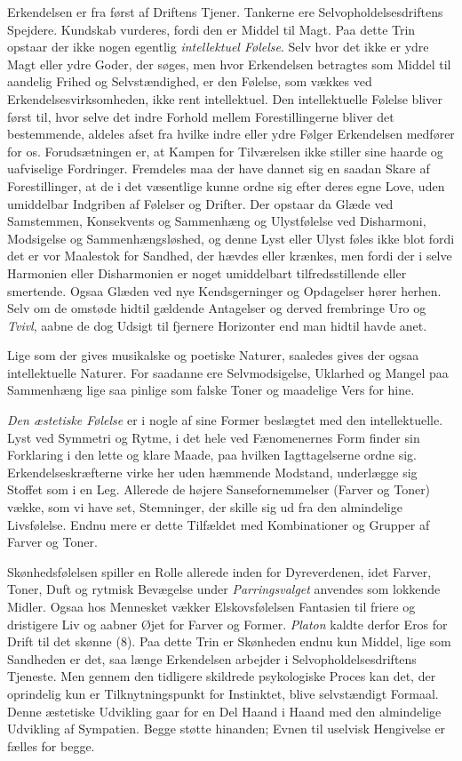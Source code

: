 \documentclass[12pt,a4paper,openany]{book}
\newcommand{\opage}[1]{\marginnote{\footnotesize\textit{[#1]}}}
\begin{document}
Erkendelsen er fra først af Driftens Tjener. Tankerne ere
Selvopholdelsesdriftens Spejdere. Kundskab vurderes, fordi den er Middel
til Magt. Paa dette Trin opstaar der ikke nogen egentlig
\emph{intellektuel Følelse}. Selv hvor det ikke er ydre Magt eller ydre
Goder, der søges, men hvor Erkendelsen betragtes som Middel til aandelig
Frihed og Selvstændighed, er den Følelse, som vækkes ved
Erkendelsesvirksomheden, ikke rent intellektuel. Den intellektuelle
Følelse bliver først til, hvor selve det indre Forhold mellem
Forestillingerne bliver det bestemmende, aldeles afset fra hvilke indre
eller ydre Følger Erkendelsen medfører for os. Forudsætningen er, at
Kampen for Tilværelsen ikke stiller sine haarde og uafviselige
Fordringer. Fremdeles maa der have dannet sig en saadan Skare af
Forestillinger, at de i det væsentlige kunne ordne sig efter deres egne
Love, uden umiddelbar Indgriben af Følelser og Drifter. Der opstaar da
Glæde ved Samstemmen, Konsekvents og Sammenhæng og Ulystfølelse ved
Disharmoni, Modsigelse og Sammenhængsløshed, og denne Lyst eller Ulyst
føles ikke blot fordi det er vor Maalestok for Sandhed, der hævdes eller
krænkes, men fordi der i selve Harmonien eller Disharmonien er noget
umiddelbart tilfredsstillende eller smertende. Ogsaa Glæden ved nye
Kendsgerninger og Opdagelser hører herhen. Selv om de omstøde hidtil
gældende Antagelser
\opage{315}og derved frembringe Uro og \emph{Tvivl}, aabne de dog Udsigt
til fjernere Horizonter end man hidtil havde anet.

Lige som der gives musikalske og poetiske Naturer, saaledes gives der
ogsaa intellektuelle Naturer. For saadanne ere Selvmodsigelse, Uklarhed
og Mangel paa Sammenhæng lige saa pinlige som falske Toner og maadelige
Vers for hine.

\emph{Den æstetiske Følelse} er i nogle af sine Former beslægtet med den
intellektuelle. Lyst ved Symmetri og Rytme, i det hele ved Fænomenernes
Form finder sin Forklaring i den lette og klare Maade, paa hvilken
Iagttagelserne ordne sig. Erkendelseskræfterne virke her uden hæmmende
Modstand, underlægge sig Stoffet som i en Leg. Allerede de højere
Sansefornemmelser (Farver og Toner) vække, som vi have set, Stemninger,
der skille sig ud fra den almindelige Livsfølelse. Endnu mere er dette
Tilfældet med Kombinationer og Grupper af Farver og Toner.

Skønhedsfølelsen spiller en Rolle allerede inden for Dyreverdenen, idet
Farver, Toner, Duft og rytmisk Bevægelse under \emph{Parringsvalget}
anvendes som lokkende Midler. Ogsaa hos Mennesket vækker Elskovsfølelsen
Fantasien til friere og dristigere Liv og aabner Øjet for Farver og
Former. \emph{Platon} kaldte derfor Eros for Drift til det skønne (8).
Paa dette Trin er Skønheden endnu kun Middel, lige som Sandheden er det,
saa længe Erkendelsen arbejder i Selvopholdelsesdriftens Tjeneste. Men
gennem den tidligere skildrede psykologiske Proces kan det, der
oprindelig kun er Tilknytningspunkt for Instinktet, blive selvstændigt
Formaal. Denne æstetiske Udvikling gaar for en Del Haand i Haand med den
almindelige Udvikling af Sympatien. Begge støtte hinanden; Evnen til
uselvisk Hengivelse er fælles for begge.
\end{document}
